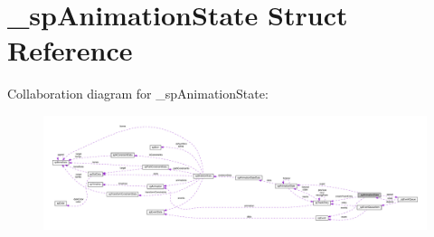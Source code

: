 \hypertarget{struct__spAnimationState}{}\section{\+\_\+sp\+Animation\+State Struct Reference}
\label{struct__spAnimationState}


Collaboration diagram for \+\_\+sp\+Animation\+State\+:
\nopagebreak
\begin{figure}[H]
\begin{center}
\leavevmode
\includegraphics[width=350pt]{struct__spAnimationState__coll__graph}
\end{center}
\end{figure}
